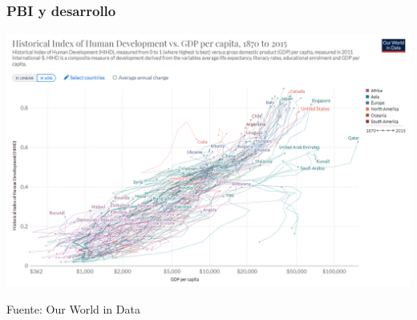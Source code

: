 \documentclass{beamer}
\begin{document}

\begin{frame}
\frametitle{PBI y desarrollo}
\begin{center}
    \href{https://ourworldindata.org/grapher/hdi-vs-gdp-per-capita} {\includegraphics[scale=0.35]{Slides Principios de Economia/Tema_11.27_hdi_2.png}}
\end{center}
Fuente: Our World in Data
\end{frame}
\end{document}
